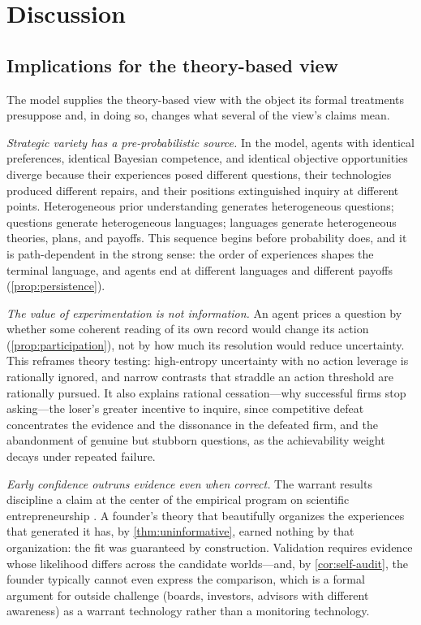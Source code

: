 \documentclass[11pt]{article}
\theoremstyle{definition}
\begin{document}
\section{Discussion}
\label{sec:discussion}

\subsection{Implications for the theory-based view}

The model supplies the theory-based view with the object its formal
treatments presuppose and, in doing so, changes what several of the view's
claims mean.

\emph{Strategic variety has a pre-probabilistic source.}  In the model,
agents with identical preferences, identical Bayesian competence, and
identical objective opportunities diverge because their experiences posed
different questions, their technologies produced different repairs, and
their positions extinguished inquiry at different points.  Heterogeneous
prior understanding generates heterogeneous questions; questions generate
heterogeneous languages; languages generate heterogeneous theories, plans,
and payoffs.  This sequence begins before probability does, and it is
path-dependent in the strong sense: the order of experiences shapes the
terminal language, and agents end at different languages and different payoffs
(\cref{prop:persistence}).

\emph{The value of experimentation is not information.}  An agent prices a
question by whether some coherent reading of its own record would change its
action (\cref{prop:participation}), not by how much its resolution would
reduce uncertainty.  This reframes theory testing: high-entropy uncertainty
with no action leverage is rationally ignored, and narrow contrasts that
straddle an action threshold are rationally pursued.  It also explains
rational cessation---why successful firms stop asking---the loser's greater
incentive to inquire, since competitive defeat concentrates the evidence and
the dissonance in the defeated firm, and the abandonment of genuine but
stubborn questions, as the achievability weight decays under repeated failure.

\emph{Early confidence outruns evidence even when correct.}  The warrant
results discipline a claim at the center of the empirical program on
scientific entrepreneurship \citep{CamuffoEtAl2020,ZellwegerZenger2023}.  A
founder's theory that beautifully organizes the experiences that generated
it has, by \cref{thm:uninformative}, earned nothing by that organization:
the fit was guaranteed by construction.  Validation requires evidence whose
likelihood differs across the candidate worlds---and, by
\cref{cor:self-audit}, the founder typically cannot even express the
comparison, which is a formal argument for outside challenge (boards,
investors, advisors with different awareness) as a warrant technology rather
than a monitoring technology.
\end{document}
